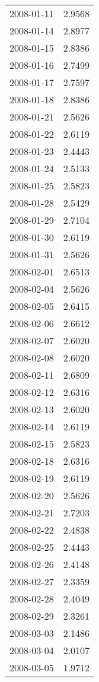 \begin{tabular}{lr}
2008-01-11 &      2.9568 \\
2008-01-14 &      2.8977 \\
2008-01-15 &      2.8386 \\
2008-01-16 &      2.7499 \\
2008-01-17 &      2.7597 \\
2008-01-18 &      2.8386 \\
2008-01-21 &      2.5626 \\
2008-01-22 &      2.6119 \\
2008-01-23 &      2.4443 \\
2008-01-24 &      2.5133 \\
2008-01-25 &      2.5823 \\
2008-01-28 &      2.5429 \\
2008-01-29 &      2.7104 \\
2008-01-30 &      2.6119 \\
2008-01-31 &      2.5626 \\
2008-02-01 &      2.6513 \\
2008-02-04 &      2.5626 \\
2008-02-05 &      2.6415 \\
2008-02-06 &      2.6612 \\
2008-02-07 &      2.6020 \\
2008-02-08 &      2.6020 \\
2008-02-11 &      2.6809 \\
2008-02-12 &      2.6316 \\
2008-02-13 &      2.6020 \\
2008-02-14 &      2.6119 \\
2008-02-15 &      2.5823 \\
2008-02-18 &      2.6316 \\
2008-02-19 &      2.6119 \\
2008-02-20 &      2.5626 \\
2008-02-21 &      2.7203 \\
2008-02-22 &      2.4838 \\
2008-02-25 &      2.4443 \\
2008-02-26 &      2.4148 \\
2008-02-27 &      2.3359 \\
2008-02-28 &      2.4049 \\
2008-02-29 &      2.3261 \\
2008-03-03 &      2.1486 \\
2008-03-04 &      2.0107 \\
2008-03-05 &      1.9712 \\

\end{tabular}
